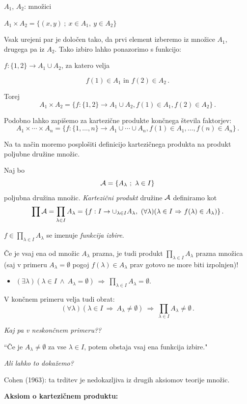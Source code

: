 \documentclass[11pt,paper=b5,DIV=13,headinclude,footinclude]{scrbook}
\def\inn {{~\wedge~}}
\def\sledi {{~\Rightarrow~}}
\begin{document}
$A_1$, $A_2$: množici

$A_1\times A_2 = \{(x,y)~;~x\in A_1,~y\in A_2\}$

Vsak urejeni par je določen tako, da prvi element izberemo iz množice $A_1$, drugega pa iz $A_2$. Tako izbiro lahko ponazorimo s funkcijo:

$f:\{1,2\} \to A_1\cup A_2$, za katero velja

$$f(1)\in A_1 \textrm{ in }f(2)\in A_2\,.$$

Torej
$$A_1\times A_2 = \{f:\{1,2\} \to A_1\cup A_2,
f(1)\in A_1, f(2)\in A_2\}\,.$$

Podobno lahko zapišemo za kartezične produkte končnega števila faktorjev:
$$A_1\times \cdots \times A_n= \{f:\{1,\ldots, n\} \to A_1\cup \cdots\cup A_n,
f(1)\in A_1, \ldots, f(n)\in A_n\}\,.$$

\bigskip
Na ta način moremo posplošiti definicijo kartezičnega produkta na produkt poljubne družine množic.

Naj bo
$${\cal A}=\{A_{\lambda}~;~\lambda\in I\}$$
poljubna družina množic. {\em Kartezični produkt} družine ${\cal A}$ definiramo kot $$\prod{\cal A} = \prod_{\lambda\in I}A_\lambda = \{f:I\to\cup_{\lambda\in I}A_\lambda,~(\forall\lambda)(\lambda\in I\sledi f(\lambda)\in A_\lambda)\}\,.$$

$f\in \prod_{\lambda\in I}A_\lambda$ se imenuje {\em funkcija izbire}.

Če je vsaj ena od množic $A_\lambda$ prazna, je tudi produkt $\prod_{\lambda\in I}A_\lambda$ prazna množica (saj v primeru $A_\lambda = \emptyset$ pogoj $f(\lambda) \in A_\lambda$ prav gotovo ne more biti izpolnjen)!
\begin{itemize}
  \item $(\exists \lambda)(\lambda\in I\inn A_\lambda = \emptyset)\sledi \prod_{\lambda\in I}A_\lambda=\emptyset$.
\end{itemize}

V končnem primeru velja tudi obrat:
$$(\forall \lambda)(\lambda\in I\sledi A_\lambda\neq\emptyset)\sledi
      \prod_{\lambda\in I}A_\lambda\neq\emptyset\,.$$

{\em Kaj pa v neskončnem primeru??}

``Če je $A_\lambda\neq \emptyset$ za vse $\lambda\in I$, potem obstaja vsaj ena funkcija izbire."~

{\em Ali lahko to dokažemo?}

Cohen (1963): ta trditev je nedokazljiva iz drugih aksiomov teorije množic.

\bigskip
\textbf{Aksiom o kartezičnem produktu:}
\end{document}
